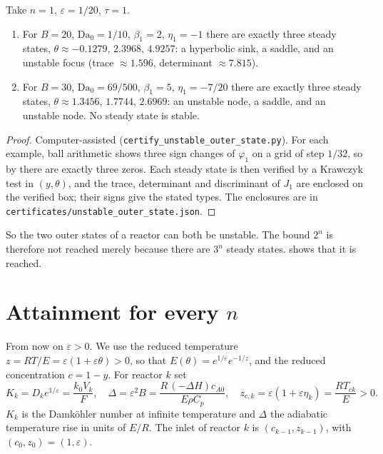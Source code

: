 \documentclass[11pt,a4paper]{report}
\newcommand*{\Da}{\mathrm{Da}_0}
\newcommand*{\eps}{\varepsilon}
\begin{document}
\begin{proposition}[note={outer states can be unstable}]\label{prop:unstable}
Take \(n=1\), \(\eps=1/20\), \(\tau=1\).
\begin{enumerate}
\item For \(B=20\), \(\Da=1/10\), \(\beta_1=2\), \(\eta_1=-1\) there are exactly three steady states,
\(\theta\approx-0.1279\), \(2.3968\), \(4.9257\): a hyperbolic sink, a saddle, and an unstable focus (trace
\(\approx1.596\), determinant \(\approx7.815\)).
\item For \(B=30\), \(\Da=69/500\), \(\beta_1=5\), \(\eta_1=-7/20\) there are exactly three steady states,
\(\theta\approx1.3456\), \(1.7744\), \(2.6969\): an unstable node, a saddle, and an unstable node. No steady state is
stable.
\end{enumerate}
\end{proposition}
\begin{proof}
Computer-assisted (\texttt{certify\_unstable\_outer\_state.py}). For each example, ball arithmetic shows three sign
changes of \(\varphi_1\) on a grid of step \(1/32\), so by  there are exactly three zeros. Each steady
state is then verified by a Krawczyk test in \((y,\theta)\), and the trace, determinant and discriminant of \(J_1\) are
enclosed on the verified box; their signs give the stated types. The enclosures are in
\texttt{certificates/unstable\_outer\_state.json}.
\end{proof}

So the two outer states of a reactor can both be unstable. The bound \(2^n\) is therefore not reached merely because
there are \(3^n\) steady states.  shows that it is reached.

\section{Attainment for every \texorpdfstring{\(n\)}{n}}\label{sec:attain}

From now on \(\eps>0\). We use the reduced temperature \(z=RT/E=\eps(1+\eps\theta)>0\), so that
\(E(\theta)=e^{1/\eps}e^{-1/z}\), and the reduced concentration \(c=1-y\). For reactor \(k\) set
\[
K_k=D_ke^{1/\eps}=\frac{k_0V_k}F,\quad \Delta=\eps^2B=\frac{R\,(-\Delta H)c_{A0}}{E\rho C_p},\quad
z_{c,k}=\eps(1+\eps\eta_k)=\frac{RT_{ck}}E>0 .
\]
\(K_k\) is the Damköhler number at infinite temperature and \(\Delta\) the adiabatic temperature rise in units of
\(E/R\). The inlet of reactor \(k\) is \((c_{k-1},z_{k-1})\), with \((c_0,z_0)=(1,\eps)\).
\end{document}
